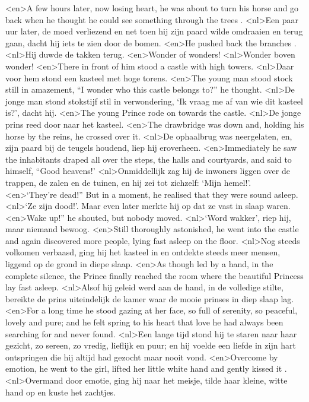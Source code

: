 <en>A few hours later, now losing heart, he was about to turn his horse and go back when he thought he could see something through the trees .
<nl>Een paar uur later,  de moed verliezend en net toen hij zijn paard wilde omdraaien en terug gaan, dacht hij iets te zien door de bomen.
<en>He pushed back the branches .
<nl>Hij duwde de takken terug.
<en>Wonder of wonders!
<nl>Wonder boven wonder!
<en>There in front of him stood a castle with high towers.
<nl>Daar voor hem stond een kasteel met hoge torens.
<en>The young man stood stock still in amazement, “I wonder who this castle belongs to?” he thought.
<nl>De jonge man stond stokstijf stil in verwondering, `Ik vraag me af van wie dit kasteel is?', dacht hij.
<en>The young Prince rode on towards the castle.
<nl>De jonge prins reed door naar het kasteel.
<en>The drawbridge was down and, holding his horse by the reins, he crossed over it.
<nl>De ophaalbrug was neergelaten, en, zijn paard bij de teugels houdend, liep hij eroverheen.
<en>Immediately he saw the inhabitants draped all over the steps, the halls and courtyards, and said to himself, “Good heavens!'
<nl>Onmiddellijk zag hij de inwoners liggen over de trappen, de zalen en de tuinen, en hij zei tot zichzelf: `Mijn hemel!'.
<en>`They’re dead!” But in a moment, he realised that they were sound asleep.
<nl>`Ze zijn dood!'. Maar even later merkte  hij op dat ze vast in slaap waren.  
<en>Wake up!” he shouted, but nobody moved.
<nl>`Word wakker', riep hij, maar niemand bewoog.
<en>Still thoroughly astonished, he went into the castle and again discovered more people, lying fast asleep on the floor.
<nl>Nog steeds volkomen verbaasd, ging hij het kasteel in en ontdekte steeds meer mensen, liggend op de grond in diepe slaap.
<en>As though led by a hand, in the complete silence, the Prince finally reached the room where the beautiful Princess lay fast asleep.
<nl>Alsof hij geleid werd aan de hand, in de volledige stilte, bereikte de prins uiteindelijk de kamer waar de mooie prinses in diep slaap lag.
<en>For a long time he stood gazing at her face, so full of serenity, so peaceful, lovely and pure; and he felt spring to his heart that love he had always been searching for and never found.
<nl>Een lange tijd stond hij te staren naar haar gezicht, zo sereen, zo vredig, lieflijk en puur; en hij voelde een liefde in zijn hart ontspringen die hij altijd had gezocht maar nooit vond. 
<en>Overcome by emotion, he went to the girl, lifted her little white hand and gently kissed it .
<nl>Overmand door emotie, ging hij naar het meisje, tilde haar kleine, witte hand op en kuste het zachtjes.
